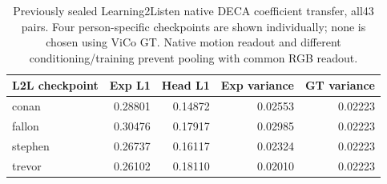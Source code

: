 \begin{table}[t]
\centering\small
\caption{Previously sealed Learning2Listen native DECA coefficient transfer, all43 pairs. Four person-specific checkpoints are shown individually; none is chosen using ViCo GT. Native motion readout and different conditioning/training prevent pooling with common RGB readout.}
\label{tab:l2l-native}
\setlength{\tabcolsep}{4pt}
\begin{tabular}{lrrrr}
\toprule
L2L checkpoint & Exp L1 & Head L1 & Exp variance & GT variance \\
\midrule
conan & 0.28801 & 0.14872 & 0.02553 & 0.02223 \\
fallon & 0.30476 & 0.17917 & 0.02985 & 0.02223 \\
stephen & 0.26737 & 0.16117 & 0.02324 & 0.02223 \\
trevor & 0.26102 & 0.18110 & 0.02010 & 0.02223 \\
\bottomrule
\end{tabular}
\end{table}
